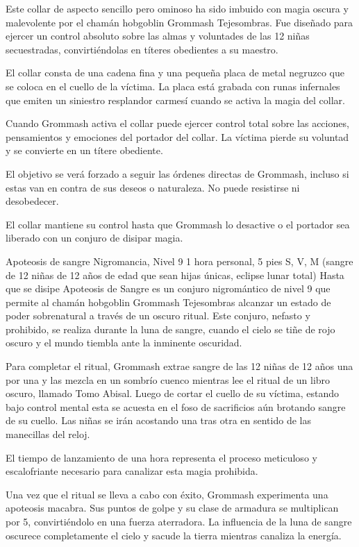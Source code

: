 \documentclass[10pt,twoside,twocolumn,openany]{dndbook}
\begin{document}
Este collar de aspecto sencillo pero ominoso ha sido imbuido con magia oscura y malevolente por el 
chamán hobgoblin Grommash Tejesombras. Fue diseñado para ejercer un control absoluto sobre las 
almas y voluntades de las 12 niñas secuestradas, convirtiéndolas en títeres obedientes a su 
maestro.

El collar consta de una cadena fina y una pequeña placa de metal negruzco que se coloca en el 
cuello de la víctima. La placa está grabada con runas infernales que emiten un siniestro 
resplandor carmesí cuando se activa la magia del collar.

Cuando Grommash activa el collar puede ejercer control total sobre las acciones, pensamientos 
y emociones del portador del collar. La víctima pierde su voluntad y se convierte en un títere 
obediente.

El objetivo se verá forzado a seguir las órdenes directas de Grommash, incluso si estas van en 
contra de sus deseos o naturaleza. No puede resistirse ni desobedecer.

El collar mantiene su control hasta que Grommash lo desactive o el portador sea liberado con un 
conjuro de disipar magia.

\DndSpellHeader%
{Apoteosis de sangre}
{Nigromancia, Nivel 9}
{1 hora}
{personal, 5 pies}
{S, V, M (sangre de 12 niñas de 12 años de edad que sean hijas únicas, eclipse lunar total)}
{Hasta que se disipe}
Apoteosis de Sangre es un conjuro nigromántico de nivel 9 que permite al chamán hobgoblin 
Grommash Tejesombras alcanzar un estado de poder sobrenatural a través de un oscuro ritual. Este 
conjuro, nefasto y prohibido, se realiza durante la luna de sangre, cuando el cielo se tiñe de 
rojo oscuro y el mundo tiembla ante la inminente oscuridad.

Para completar el ritual, Grommash extrae sangre de las 12 niñas de 12 años una por una y las 
mezcla en un sombrío cuenco mientras lee el ritual de un libro oscuro, llamado Tomo Abisal. Luego 
de cortar el cuello de su víctima, estando bajo control mental esta se acuesta en el foso de 
sacrificios aún brotando sangre de su cuello. Las niñas se irán acostando una tras otra en sentido 
de las manecillas del reloj.

El tiempo de lanzamiento de una hora representa el proceso meticuloso y escalofriante necesario 
para canalizar esta magia prohibida.

Una vez que el ritual se lleva a cabo con éxito, Grommash experimenta una apoteosis macabra. Sus 
puntos de golpe y su clase de armadura se multiplican por 5, convirtiéndolo en una fuerza 
aterradora. La influencia de la luna de sangre oscurece completamente el cielo y sacude la tierra 
mientras canaliza la energía.
\end{document}
